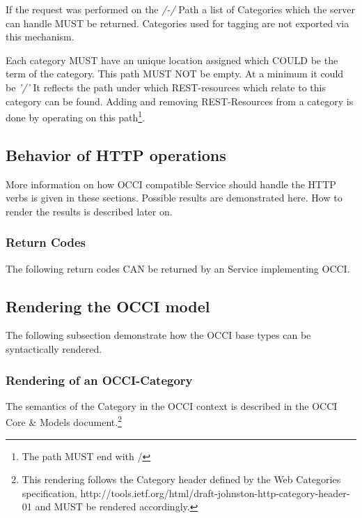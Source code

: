 \documentclass[10pt,a4paper]{article}
\begin{document}
If the request was performed on the \textit{/-/} Path a list of
Categories which the server can handle MUST be returned. Categories
used for tagging are not exported via this mechanism.

Each category MUST have an unique location assigned which COULD be the
term of the category. This path MUST NOT be empty. At a minimum it
could be \textit{'/'} It reflects the path under which REST-resources
which relate to this category can be found. Adding and removing
REST-Resources from a category is done by operating on this
path\footnote{The path MUST end with /}.

\subsection{Behavior of HTTP operations}

More information on how OCCI compatible Service should handle the HTTP
verbs is given in these sections. Possible results are demonstrated
here. How to render the results is described later on.

\subsubsection{Return Codes}
The following return codes CAN be returned by an Service implementing
OCCI.

\subsection{Rendering the OCCI model}
\label{sec:model_rendering}
The following subsection demonstrate how the OCCI base types can be
syntactically rendered.


\subsubsection{Rendering of an OCCI-Category}

The semantics of the Category in the OCCI context is described in the
OCCI Core \& Models document.\footnote{This rendering follows the
  Category header defined by the Web Categories specification,
  http://tools.ietf.org/html/draft-johnston-http-category-header-01
  and MUST be rendered accordingly.}

\end{document}
